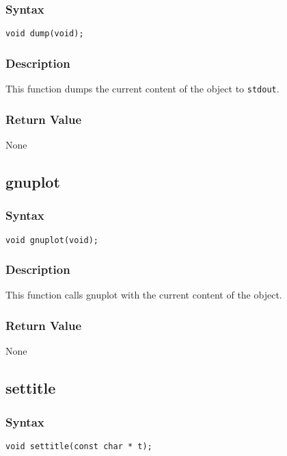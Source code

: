 \documentclass[dvips,11pt,fleqn]{report}
\begin{document}
\subsubsection*{Syntax}
\begin{verbatim}
void dump(void);
\end{verbatim}
\subsubsection*{Description}
This function dumps the current content of the object to {\tt stdout}.

\subsubsection*{Return Value}

None

\newpage

\subsection*{gnuplot}
\subsubsection*{Syntax}
\begin{verbatim}
void gnuplot(void);
\end{verbatim}
\subsubsection*{Description}
This function calls \textsf{gnuplot} with the current content of the object.

\subsubsection*{Return Value}

None

\newpage

\subsection*{settitle}
\subsubsection*{Syntax}
\begin{verbatim}
void settitle(const char * t);
\end{verbatim}
\end{document}
